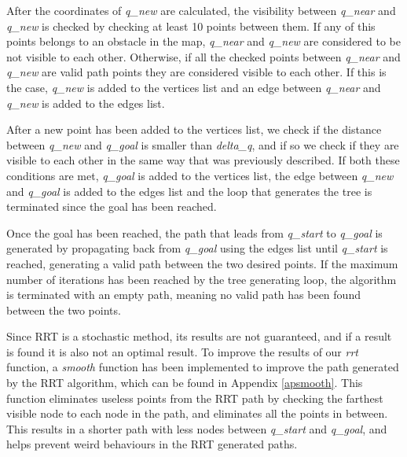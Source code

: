\documentclass[journal]{IEEEtran}
\begin{document}
After the coordinates of \textit{q\_new} are calculated, the visibility between \textit{q\_near} and \textit{q\_new} is checked by checking at least 10 points between them. If any of this points belongs to an obstacle in the map, \textit{q\_near} and \textit{q\_new} are considered to be not visible to each other. Otherwise, if all the checked points between \textit{q\_near} and \textit{q\_new} are valid path points they are considered visible to each other. If this is the case, \textit{q\_new} is added to the vertices list and an edge between \textit{q\_near} and \textit{q\_new} is added to the edges list.

After a new point has been added to the vertices list, we check if the distance between \textit{q\_new} and \textit{q\_goal} is smaller than \textit{delta\_q}, and if so we check if they are visible to each other in the same way that was previously described. If both these conditions are met, \textit{q\_goal} is added to the vertices list, the edge between \textit{q\_new} and \textit{q\_goal} is added to the edges list and the loop that generates the tree is terminated since the goal has been reached.

Once the goal has been reached, the path that leads from \textit{q\_start} to \textit{q\_goal} is generated by propagating back from \textit{q\_goal} using the edges list until \textit{q\_start} is reached, generating a valid path between the two desired points. If the maximum number of iterations has been reached by the tree generating loop, the algorithm is terminated with an empty path, meaning no valid path has been found between the two points.

Since RRT is a stochastic method, its results are not guaranteed, and if a result is found it is also not an optimal result. To improve the results of our \textit{rrt} function, a \textit{smooth} function has been implemented to improve the path generated by the RRT algorithm, which can be found in Appendix \ref{apsmooth}. This function eliminates useless points from the RRT path by checking the farthest visible node to each node in the path, and eliminates all the points in between. This results in a shorter path with less nodes between \textit{q\_start} and \textit{q\_goal}, and helps prevent weird behaviours in the RRT generated paths.



\end{document}
